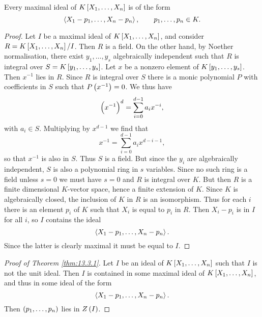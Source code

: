 \pagebreak

\begin{corollary}
Every maximal ideal of $ K\sbr{X_1, \dots, X_n} $ is of the form
$$ \left\langle X_1 - p_1, \dots, X_n - p_n \right\rangle, \qquad p_1, \dots, p_n \in K. $$
\end{corollary}

\begin{proof}
Let $ I $ be a maximal ideal of $ K\sbr{X_1, \dots, X_n} $, and consider $ R = K\sbr{X_1, \dots, X_n} / I $. Then $ R $ is a field. On the other hand, by Noether normalisation, there exist $ y_1, \dots, y_s $ algebraically independent such that $ R $ is integral over $ S = K\sbr{y_1, \dots, y_s} $. Let $ x $ be a nonzero element of $ K\sbr{y_1, \dots, y_s} $. Then $ x^{-1} $ lies in $ R $. Since $ R $ is integral over $ S $ there is a monic polynomial $ P $ with coefficients in $ S $ such that $ P\br{x^{-1}} = 0 $. We thus have
$$ \br{x^{-1}}^d = \sum_{i = 0}^{d - 1} a_ix^{-i}, $$
with $ a_i \in S $. Multiplying by $ x^{d - 1} $ we find that
$$ x^{-1} = \sum_{i = 0}^{d - 1} a_ix^{d - i - 1}, $$
so that $ x^{-1} $ is also in $ S $. Thus $ S $ is a field. But since the $ y_i $ are algebraically independent, $ S $ is also a polynomial ring in $ s $ variables. Since no such ring is a field unless $ s = 0 $ we must have $ s = 0 $ and $ R $ is integral over $ K $. But then $ R $ is a finite dimensional $ K $-vector space, hence a finite extension of $ K $. Since $ K $ is algebraically closed, the inclusion of $ K $ in $ R $ is an isomorphism. Thus for each $ i $ there is an element $ p_i $ of $ K $ such that $ X_i $ is equal to $ p_i $ in $ R $. Then $ X_i - p_i $ is in $ I $ for all $ i $, so $ I $ contains the ideal
$$ \left\langle X_1 - p_1, \dots, X_n - p_n \right\rangle. $$
Since the latter is clearly maximal it must be equal to $ I $.
\end{proof}

\begin{proof}[Proof of Theorem \ref{thm:13.3.1}]
Let $ I $ be an ideal of $ K\sbr{X_1, \dots, X_n} $ such that $ I $ is not the unit ideal. Then $ I $ is contained in some maximal ideal of $ K\sbr{X_1, \dots, X_n} $, and thus in some ideal of the form
$$ \left\langle X_1 - p_1, \dots, X_n - p_n \right\rangle. $$
Then $ \br{p_1, \dots, p_n} $ lies in $ Z\br{I} $.
\end{proof}

